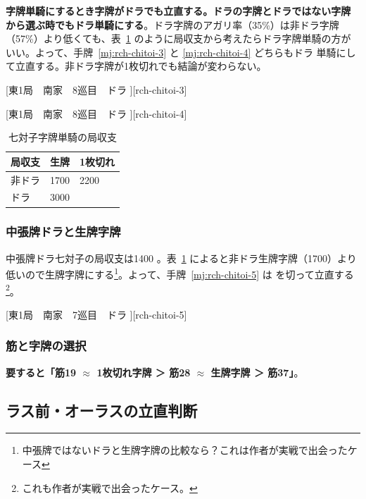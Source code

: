\documentclass[../nankiru_main.tex]{subfiles}
\begin{document}
\textbf{字牌単騎にするとき字牌がドラでも立直する。ドラの字牌とドラではない字牌から選ぶ時でもドラ単騎にする}\citep[][pp.~113--114]{miinin-choice}。ドラ字牌のアガリ率（35\%）は非ドラ字牌（57\%）より低くても、表~\ref{tab:ev-chitoi} のように局収支から考えたらドラ字牌単騎の方がいい。よって、手牌~\ref{mj:rch-chitoi-3} と \ref{mj:rch-chitoi-4} どちらもドラ  単騎にして立直する。非ドラ字牌が1枚切れでも結論が変わらない。

[東1局　南家　8巡目　ドラ ][rch-chitoi-3]

[東1局　南家　8巡目　ドラ ][rch-chitoi-4]

\begin{table}[ht]
  \centering
  \begin{tabular}{l|ll}
    局収支 & 生牌 & 1枚切れ \\
    \hline
    非ドラ & 1700 & 2200 \\
    ドラ　 & 3000 &  \\
  \end{tabular}
  \caption{七対子字牌単騎の局収支}
  \label{tab:ev-chitoi}
\end{table}


\subsubsection*{中張牌ドラと生牌字牌}

中張牌ドラ七対子の局収支は1400 \citep[][p.~110]{miinin-choice}。表~\ref{tab:ev-chitoi} によると非ドラ生牌字牌（1700）より低いので生牌字牌にする\footnote{中張牌ではないドラと生牌字牌の比較なら？これは作者が実戦で出会ったケース}。よって、手牌~\ref{mj:rch-chitoi-5} は  を切って立直する\footnote{これも作者が実戦で出会ったケース。}。

[東1局　南家　7巡目　ドラ ][rch-chitoi-5]


\subsubsection*{筋と字牌の選択}

\textbf{要すると「筋19 $\approx$ 1枚切れ字牌 ＞ 筋28 $\approx$ 生牌字牌 ＞ 筋37」}\citep[][pp.~115--116]{miinin-choice}。



\subsection{ラス前・オーラスの立直判断}
\end{document}
